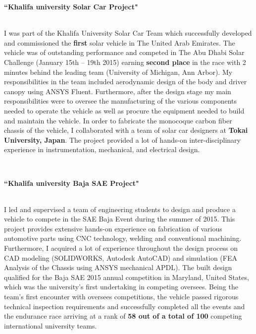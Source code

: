 \documentclass[12pt]{article} %
\begin{document}
{	{\raggedright\textbf{``Khalifa university Solar Car Project"}}\\
	I was part of the Khalifa University Solar Car Team which successfully developed and commissioned the \textbf{first} solar vehicle in The United Arab Emirates. The vehicle was of outstanding performance and competed in The Abu Dhabi Solar Challenge (January 15th – 19th 2015) earning \textbf{second place} in the race with 2 minutes behind the leading team (University of Michigan, Ann Arbor). My responsibilities in the team included aerodynamic design of the body and driver canopy using ANSYS Fluent. Furthermore, after the design stage my main responsibilities were to oversee the manufacturing of the various components needed to operate the vehicle as well as procure the equipment needed to build and maintain the vehicle. In order to fabricate the monocoque carbon fiber chassis of the vehicle, I collaborated with a team of solar car designers at \textbf{Tokai University, Japan}. The project provided a lot of hands-on inter-disciplinary experience in instrumentation, mechanical, and electrical design.

	~
	~
	~

	\medskip %

	{\raggedright\textbf{``Khalifa university Baja SAE Project"}}\\
	I led and supervised a team of engineering students to design and produce a vehicle to compete in the SAE Baja Event during the summer of 2015. This project provides extensive hands-on experience on fabrication of various automotive parts using CNC technology, welding and conventional machining. Furthermore, I acquired a lot of experience throughout the design process on CAD modeling (SOLIDWORKS, Autodesk AutoCAD) and simulation (FEA Analysis of the Chassis using ANSYS mechanical APDL). The built design qualified for the Baja SAE 2015 annual competition in Maryland, United States, which was the university’s first undertaking in competing oversees. Being the team’s first encounter with oversees competitions, the vehicle passed rigorous technical inspection requirements and successfully completed all the events and the endurance race arriving at a rank of \textbf{58 out of a total of 100} competing international university teams.

	~
	~
	~

}
\end{document}
